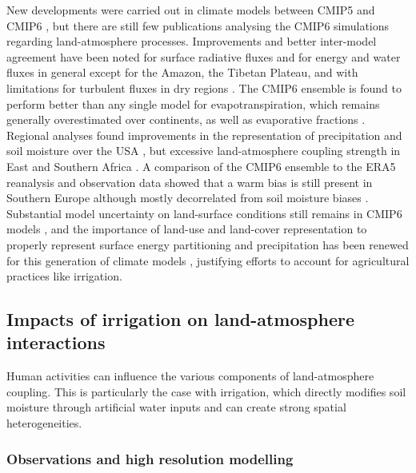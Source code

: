 New developments were carried out in climate models between CMIP5 and CMIP6 \citep[e.g.][]{lawrence_community_2019, cheruy_improved_2020}, but there are still few publications analysing the CMIP6 simulations regarding land-atmosphere processes. Improvements and better inter-model agreement have been noted for surface radiative fluxes \citep{wild_global_2020} and for energy and water fluxes in general except for the Amazon, the Tibetan Plateau, and with limitations for turbulent fluxes in dry regions \citep{li_evaluation_2021}. The CMIP6 ensemble is found to perform better than any single model for evapotranspiration, which remains generally overestimated over continents, as well as evaporative fractions \citep{wang_evaluation_2021, yuan_understanding_2022}.
Regional analyses found improvements in the representation of precipitation and soil moisture over the USA \citep{srivastava_evaluation_2020, yuan_historical_2021}, but excessive land-atmosphere coupling strength in East and Southern Africa \citep{mwanthi_representation_2024}. A comparison of the CMIP6 ensemble to the ERA5 reanalysis and observation data showed that a warm bias is still present in Southern Europe although mostly decorrelated from soil moisture biases \citep{osso_assessment_2023}. 
Substantial model uncertainty on land-surface conditions still remains in CMIP6 models \citep{yuan_historical_2021}, and the importance of land-use and land-cover representation to properly represent surface energy partitioning and precipitation has been renewed for this generation of climate models \citep{devanand_land_2020,singh_land-use_2024}, justifying efforts to account for agricultural practices like irrigation.

\subsection{Impacts of irrigation on land-atmosphere interactions}
\label{sec:irrig_landatmosphere}
Human activities can influence the various components of land-atmosphere coupling. This is particularly the case with irrigation, which directly modifies soil moisture through artificial water inputs and can create strong spatial heterogeneities. 

\subsubsection*{Observations and high resolution modelling}

